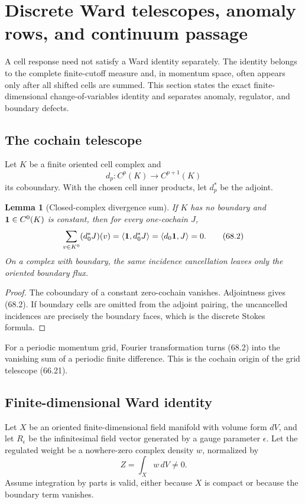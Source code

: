\documentclass[11pt]{article}
\newtheorem{lemma}[theorem]{Lemma}
\begin{document}
\section{Discrete Ward telescopes, anomaly rows, and continuum passage}
\label{sec:v11v68}

A cell response need not satisfy a Ward identity separately.  The
identity belongs to the complete finite-cutoff measure and, in momentum
space, often appears only after all shifted cells are summed.  This
section states the exact finite-dimensional change-of-variables
identity and separates anomaly, regulator, and boundary defects.

\subsection{The cochain telescope}

Let \(K\) be a finite oriented cell complex and
\[
                         d_p:C^p(K)\to C^{p+1}(K)             \tag{68.1}
\]
its coboundary.  With the chosen cell inner products, let
\(d_p^*\) be the adjoint.

\begin{lemma}[Closed-complex divergence sum]
\label{lem:v11v68-divergence}
If \(K\) has no boundary and \({\bf1}\in C^0(K)\) is constant, then for
every one-cochain \(J\),
\[
                         \sum_{v\in K^0}(d_0^*J)(v)
          =\langle{\bf1},d_0^*J\rangle
          =\langle d_0{\bf1},J\rangle=0.                     \tag{68.2}
\]
On a complex with boundary, the same incidence cancellation leaves
only the oriented boundary flux.
\end{lemma}

\begin{proof}
The coboundary of a constant zero-cochain vanishes.  Adjointness gives
(68.2).  If boundary cells are omitted from the adjoint pairing, the
uncancelled incidences are precisely the boundary faces, which is the
discrete Stokes formula.
\end{proof}

For a periodic momentum grid, Fourier transformation turns (68.2)
into the vanishing sum of a periodic finite difference.  This is the
cochain origin of the grid telescope (66.21).

\subsection{Finite-dimensional Ward identity}

Let \(X\) be an oriented finite-dimensional field manifold with volume
form \(dV\), and let \(R_\epsilon\) be the infinitesimal field vector
generated by a gauge parameter \(\epsilon\).  Let the regulated weight
be a nowhere-zero complex density \(w\), normalized by
\[
                              Z=\int_Xw\,dV\ne0.               \tag{68.3}
\]
Assume integration by parts is valid, either because \(X\) is compact
or because the boundary term vanishes.
\end{document}

